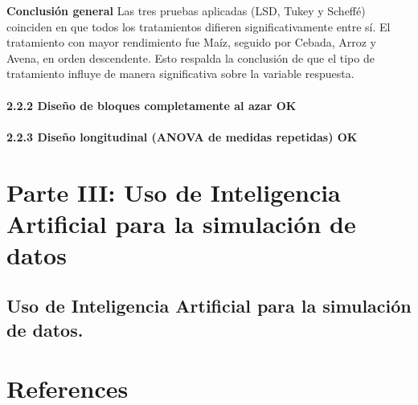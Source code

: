 \documentclass[
  letterpaper,
  DIV=11,
  numbers=noendperiod]{scrreprt}
\begin{document}
\textbf{Conclusión general} Las tres pruebas aplicadas (LSD, Tukey y
Scheffé) coinciden en que todos los tratamientos difieren
significativamente entre sí. El tratamiento con mayor rendimiento fue
Maíz, seguido por Cebada, Arroz y Avena, en orden descendente. Esto
respalda la conclusión de que el tipo de tratamiento influye de manera
significativa sobre la variable respuesta.

\subsubsection{2.2.2 Diseño de bloques completamente al azar
OK}\label{diseuxf1o-de-bloques-completamente-al-azar-ok}

\subsubsection{2.2.3 Diseño longitudinal (ANOVA de medidas repetidas)
OK}\label{diseuxf1o-longitudinal-anova-de-medidas-repetidas-ok}


\chapter{Parte III: Uso de Inteligencia Artificial para la simulación de
datos}\label{parte-iii-uso-de-inteligencia-artificial-para-la-simulaciuxf3n-de-datos}

\section{Uso de Inteligencia Artificial para la simulación de
datos.}\label{uso-de-inteligencia-artificial-para-la-simulaciuxf3n-de-datos.}

\subsection{}\label{section}


\chapter*{References}\label{references}

\end{document}
